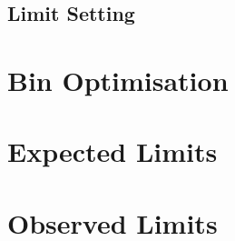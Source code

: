 \subsection{Limit Setting}

\section{Bin Optimisation}

\section{Expected Limits}

\section{Observed Limits}
